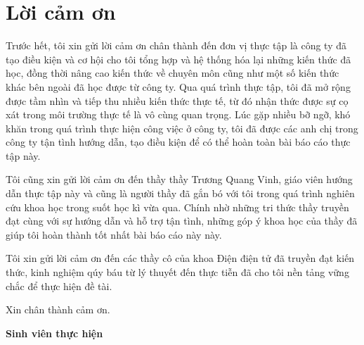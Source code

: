 \chapter*{Lời cảm ơn}
Trước hết, tôi xin gửi lời cảm ơn chân thành đến đơn vị thực tập là công ty đã tạo điều kiện và cơ hội
cho tôi tổng hợp và hệ thống hóa lại những kiến thức đã học, đồng thời nâng cao kiến thức về chuyên môn
cũng như một số kiến thức khác bên ngoài đã học được từ công ty.
Qua quá trình thực tập, tôi đã mở rộng được tầm nhìn và tiếp thu nhiều kiến thức thực tế, từ đó
nhận thức được sự cọ xát trong môi trường thực tế là vô cùng quan trọng.
Lúc gặp nhiều bỡ ngỡ, khó khăn trong quá trình thực hiện công việc ở công ty, tôi đã được các anh chị
trong công ty tận tình hướng dẫn, tạo điều kiện để có thể hoàn toàn bài báo cáo thực tập này.

Tôi cũng xin gửi lời cảm ơn đến thầy thầy Trương Quang Vinh,
giáo viên hướng dẫn thực tập này và cũng là người thầy đã gắn bó với tôi trong quá trình nghiên cứu khoa học trong suốt học kì vừa qua.
Chính nhờ những tri thức thầy truyền đạt cùng với sự hướng dẫn và hỗ trợ tận tình, những góp ý khoa học của thầy đã giúp tôi hoàn thành tốt nhất bài báo cáo này này.

Tôi xin gửi lời cảm ơn đến các thầy cô của khoa Điện điện tử đã truyền đạt kiến thức,
kinh nghiệm qúy báu từ lý thuyết đến thực tiễn đã cho tôi nền tảng vững chắc để thực hiện đề tài.

Xin chân thành cảm ơn.
\begin{flushright}
\textbf{Sinh viên thực hiện}
\end{flushright}
